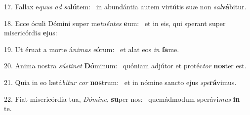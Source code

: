 17. Fallax e\textit{quus} \textit{ad} \textit{sa}\textbf{lú}tem: \ast\  in abundántia autem virtútis suæ non \textit{sal}\textbf{vá}bitur.\

18. Ecce óculi Dómini super me\textit{tu}\textit{én}\textit{tes} \textbf{e}um: \ast\  et in eis, qui sperant super misericórdi\textit{a} \textbf{e}jus:\

19. Ut éruat a morte á\textit{ni}\textit{mas} \textit{e}\textbf{ó}rum: \ast\  et alat eos \textit{in} \textbf{fa}me.\

20. Anima nostra \textit{sús}\textit{ti}\textit{net} \textbf{Dó}minum: \ast\  quóniam adjútor et protéc\textit{tor} \textbf{nos}ter est.\

21. Quia in eo lætá\textit{bi}\textit{tur} \textit{cor} \textbf{nos}trum: \ast\  et in nómine sancto ejus \textit{spe}\textbf{rá}vimus.\

22. Fiat misericórdia tua, \textit{Dó}\textit{mi}\textit{ne}, \textbf{su}per nos: \ast\  quemádmodum sperávi\textit{mus} \textbf{in} te.\

